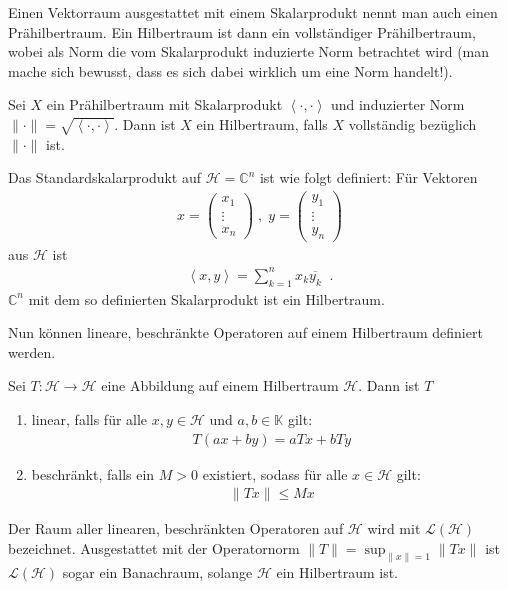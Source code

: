 Einen Vektorraum ausgestattet mit einem Skalarprodukt nennt man auch einen Prä\-hilbert\-raum. Ein Hilbertraum ist dann ein voll\-ständiger Prä\-hilbert\-raum, wobei als Norm die vom Skalarprodukt induzierte Norm betrachtet wird (man mache sich bewusst, dass es sich dabei wirklich um eine Norm handelt!).

\begin{definition}[Hilbertraum]
    Sei $X$ ein Prähilbertraum mit Skalarprodukt $\left<\cdot, \cdot \right>$ und induzierter Norm $\| \cdot \| = \sqrt{\left<\cdot, \cdot \right>}$. Dann ist $X$ ein Hilbertraum, falls $X$ vollständig bezüglich $\| \cdot \|$ ist.
\end{definition}

\begin{ex} \label{ex:standard_skp}
    Das Standardskalarprodukt auf $\mathcal{H}=\mathbb{C}^n$ ist wie folgt definiert: Für Vektoren \begin{align*}
        x = \begin{pmatrix}
            x_1 \\ \vdots \\ x_n
        \end{pmatrix} \; , \;
        y = \begin{pmatrix}
            y_1 \\ \vdots \\ y_n
        \end{pmatrix}
    \end{align*}
    aus $\mathcal{H}$
    ist \begin{align*}
        \left<x,y \right> = \sum_{k=1}^n {x_k \overline{y_k}} \;\; .
    \end{align*} 
    $\mathbb{C}^n$ mit dem so definierten Skalarprodukt ist ein Hilbertraum.
\end{ex}

Nun können lineare, beschränkte Operatoren auf einem Hilbertraum definiert werden.

\begin{definition}
    Sei $T: \mathcal{H} \longrightarrow \mathcal{H}$ eine Abbildung auf einem Hilbertraum $\mathcal{H}$. Dann ist $T$ \begin{enumerate}[label=(\roman*)]
        \item linear, falls für alle $x,y \in \mathcal{H}$ und $a ,b \in \mathbb{K}$ gilt: \begin{align*}
            T(a x + b y) = a Tx + b Ty
        \end{align*}
        \item beschränkt, falls ein $M > 0 $ existiert, sodass für alle $x \in \mathcal{H}$ gilt: \begin{align*}
            \| Tx \| \le Mx
        \end{align*}
    \end{enumerate}
    Der Raum aller linearen, beschränkten Operatoren auf $\mathcal{H}$ wird mit $\mathcal{L}(\mathcal{H})$ bezeichnet. Ausgestattet mit der Operatornorm $\|T\| = \sup_{\|x\|=1} \|Tx\| $ ist $\mathcal{L}(\mathcal{H})$ sogar ein Banachraum, solange $\mathcal{H}$ ein Hilbertraum ist. 
\end{definition}

